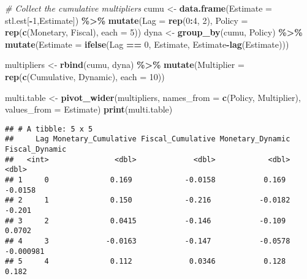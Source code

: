 \documentclass[
]{article}
\newenvironment{Shaded}{\begin{snugshade}}{\end{snugshade}}
\newcommand{\AttributeTok}[1]{\textcolor[rgb]{0.13,0.29,0.53}{#1}}
\newcommand{\CommentTok}[1]{\textcolor[rgb]{0.56,0.35,0.01}{\textit{#1}}}
\newcommand{\DecValTok}[1]{\textcolor[rgb]{0.00,0.00,0.81}{#1}}
\newcommand{\FunctionTok}[1]{\textcolor[rgb]{0.13,0.29,0.53}{\textbf{#1}}}
\newcommand{\NormalTok}[1]{#1}
\newcommand{\OtherTok}[1]{\textcolor[rgb]{0.56,0.35,0.01}{#1}}
\newcommand{\SpecialCharTok}[1]{\textcolor[rgb]{0.81,0.36,0.00}{\textbf{#1}}}
\newcommand{\StringTok}[1]{\textcolor[rgb]{0.31,0.60,0.02}{#1}}
\begin{document}
\begin{Shaded}
\begin{Highlighting}[]
\CommentTok{\# Collect the cumulative multipliers}
\NormalTok{cumu }\OtherTok{\textless{}{-}} \FunctionTok{data.frame}\NormalTok{(}\AttributeTok{Estimate =}\NormalTok{ stl.est[}\SpecialCharTok{{-}}\DecValTok{1}\NormalTok{,}\StringTok{\textquotesingle{}Estimate\textquotesingle{}}\NormalTok{]) }\SpecialCharTok{\%\textgreater{}\%}
  \FunctionTok{mutate}\NormalTok{(}\AttributeTok{Lag =} \FunctionTok{rep}\NormalTok{(}\DecValTok{0}\SpecialCharTok{:}\DecValTok{4}\NormalTok{, }\DecValTok{2}\NormalTok{),}
         \AttributeTok{Policy =} \FunctionTok{rep}\NormalTok{(}\FunctionTok{c}\NormalTok{(}\StringTok{\textquotesingle{}Monetary\textquotesingle{}}\NormalTok{, }\StringTok{\textquotesingle{}Fiscal\textquotesingle{}}\NormalTok{), }\AttributeTok{each =} \DecValTok{5}\NormalTok{))}
\NormalTok{dyna }\OtherTok{\textless{}{-}} \FunctionTok{group\_by}\NormalTok{(cumu, Policy) }\SpecialCharTok{\%\textgreater{}\%}
  \FunctionTok{mutate}\NormalTok{(}\AttributeTok{Estimate =} \FunctionTok{ifelse}\NormalTok{(Lag }\SpecialCharTok{==} \DecValTok{0}\NormalTok{, Estimate, Estimate}\SpecialCharTok{{-}}\FunctionTok{lag}\NormalTok{(Estimate)))}

\NormalTok{multipliers }\OtherTok{\textless{}{-}} \FunctionTok{rbind}\NormalTok{(cumu, dyna) }\SpecialCharTok{\%\textgreater{}\%}
  \FunctionTok{mutate}\NormalTok{(}\AttributeTok{Multiplier =} \FunctionTok{rep}\NormalTok{(}\FunctionTok{c}\NormalTok{(}\StringTok{\textquotesingle{}Cumulative\textquotesingle{}}\NormalTok{, }\StringTok{\textquotesingle{}Dynamic\textquotesingle{}}\NormalTok{), }\AttributeTok{each =} \DecValTok{10}\NormalTok{))}

\NormalTok{multi.table }\OtherTok{\textless{}{-}} \FunctionTok{pivot\_wider}\NormalTok{(multipliers,}
                           \AttributeTok{names\_from =} \FunctionTok{c}\NormalTok{(Policy, Multiplier),}
                           \AttributeTok{values\_from =}\NormalTok{ Estimate)}
\FunctionTok{print}\NormalTok{(multi.table)}
\end{Highlighting}
\end{Shaded}

\begin{verbatim}
## # A tibble: 5 x 5
##     Lag Monetary_Cumulative Fiscal_Cumulative Monetary_Dynamic Fiscal_Dynamic
##   <int>               <dbl>             <dbl>            <dbl>          <dbl>
## 1     0              0.169            -0.0158           0.169       -0.0158  
## 2     1              0.150            -0.216           -0.0182      -0.201   
## 3     2              0.0415           -0.146           -0.109        0.0702  
## 4     3             -0.0163           -0.147           -0.0578      -0.000981
## 5     4              0.112             0.0346           0.128        0.182
\end{verbatim}
\end{document}
